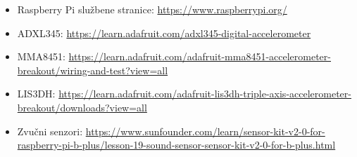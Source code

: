 \documentclass[12pt,a4paper]{article}
\begin{document}
\begin{itemize}
	\item Raspberry Pi službene stranice: \url{https://www.raspberrypi.org/}
	\item ADXL345: \url{https://learn.adafruit.com/adxl345-digital-accelerometer}
	\item MMA8451: \url{https://learn.adafruit.com/adafruit-mma8451-accelerometer-breakout/wiring-and-test?view=all}
	\item LIS3DH: \url{https://learn.adafruit.com/adafruit-lis3dh-triple-axis-accelerometer-breakout/downloads?view=all}
	\item Zvučni senzori: \url{https://www.sunfounder.com/learn/sensor-kit-v2-0-for-raspberry-pi-b-plus/lesson-19-sound-sensor-sensor-kit-v2-0-for-b-plus.html}
\end{itemize}
\end{document}
